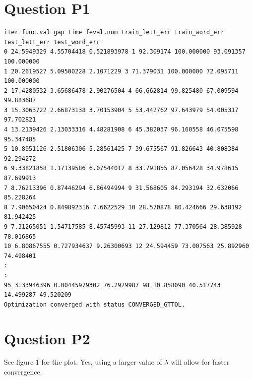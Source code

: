 \documentclass[11pt]{report}
\begin{document}
\maketitle

\section*{Question P1}
\begin{verbatim}
iter func.val gap time feval.num train_lett_err train_word_err test_lett_err test_word_err
0 24.5949329 4.55704418 0.521893978 1 92.309174 100.000000 93.091357 100.000000
1 20.2619527 5.09500228 2.1071229 3 71.379031 100.000000 72.095711 100.000000
2 17.4280532 3.65686478 2.90276504 4 66.662814 99.825480 67.009594 99.883687
3 15.3063722 2.66873138 3.70153904 5 53.442762 97.643979 54.005317 97.702821
4 13.2139426 2.13033316 4.48281908 6 45.382037 96.160558 46.075598 95.347485
5 10.8951126 2.51806306 5.28561425 7 39.675567 91.826643 40.808384 92.294272
6 9.33821858 1.17139586 6.07544017 8 33.791855 87.056428 34.978615 87.699913
7 8.76213396 0.87446294 6.86494994 9 31.568605 84.293194 32.632066 85.228264
8 7.90650424 0.849892316 7.6622529 10 28.570878 80.424666 29.638192 81.942425
9 7.31265051 1.54717585 8.45745993 11 27.129812 77.370564 28.385928 78.016865
10 6.80867555 0.727934637 9.26300693 12 24.594459 73.007563 25.892960 74.498401
:
:
95 3.33946396 0.00445979302 76.2979987 98 10.858090 40.517743 14.499287 49.520209
Optimization converged with status CONVERGED_GTTOL.
\end{verbatim}

\section*{Question P2}
See figure 1 for the plot. Yes, using a larger value of $\lambda$
will allow for faster convergence.
\end{document}
